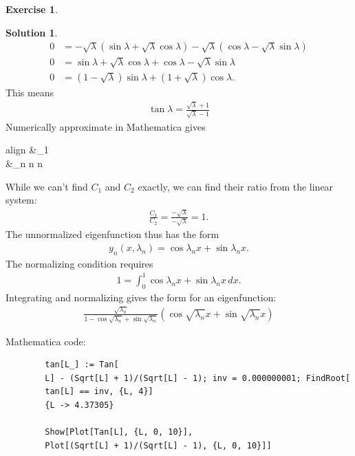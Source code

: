 \documentclass{article}
\theoremstyle{definition}
\newtheorem*{exer*}{Exercise}
\newtheorem*{sln*}{Solution}
\begin{document}
\begin{exer*}
\begin{enumerate}
\begin{sln*}
\begin{align*}
	 		0 &= -\sqrt{\lambda}(\sin\lambda + \sqrt{\lambda}\cos\lambda ) - \sqrt{\lambda}(\cos\lambda - \sqrt{\lambda}\sin\lambda)\\
	 		0 &=  \sin\lambda + \sqrt{\lambda}\cos\lambda + \cos\lambda - \sqrt{\lambda}\sin\lambda\\
	 		0 &= (1-\sqrt{\lambda})\sin\lambda + (1+\sqrt{\lambda})\cos\lambda.
	 		\end{align*}
	 		This means
	 		\begin{align*}
	 		\boxed{\tan\lambda = \frac{\sqrt{\lambda} + 1}{\sqrt{\lambda} - 1}}
	 		\end{align*}
	 		Numerically approximate in Mathematica gives
	 		\begin{empheq}[box=\fbox]{align} 
	 		&\lambda_1 \nonumber\\
	 		&\lambda_n \approx n \hspace{0.5cm} n \nonumber 
	 		\end{empheq}
	 		While we can't find $C_1$ and $C_2$ exactly, we can find their ratio from the linear system:
	 		\begin{align*}
	 		\frac{C_1}{C_2} = \frac{-\sqrt{\lambda}}{-\sqrt{\lambda}} = 1.
	 		\end{align*}
	 		The unnormalized eigenfunction thus has the form
	 		\begin{align*}
	 		y_n(x,\lambda_n) = \cos\lambda_n x + \sin\lambda_n x.
	 		\end{align*}
	 		The normalizing condition requires
	 		\begin{align*}
	 		1 = \int^1_0 \cos\lambda_n x + \sin\lambda_n x\,dx.
	 		\end{align*}
	 		Integrating and normalizing gives the form for an eigenfunction:
	 		\begin{align*}
	 		\boxed{ \frac{\sqrt{\lambda_n}}{1 - \cos\sqrt{\lambda_n} + \sin\sqrt{\lambda_n}}\left( \cos\sqrt{\lambda_n} x + \sin\sqrt{\lambda_n} x \right) }
	 		\end{align*}
	 		
	 		Mathematica code:
	 		\begin{lstlisting}
	 	tan[L_] := Tan[
	 	L] - (Sqrt[L] + 1)/(Sqrt[L] - 1); inv = 0.000000001; FindRoot[
	 	tan[L] == inv, {L, 4}]
	 	{L -> 4.37305}
	 		
	 	Show[Plot[Tan[L], {L, 0, 10}], 
	 	Plot[(Sqrt[L] + 1)/(Sqrt[L] - 1), {L, 0, 10}]]
	 		

\end{lstlisting}
\end{sln*}
\end{enumerate}
\end{exer*}
\end{document}

